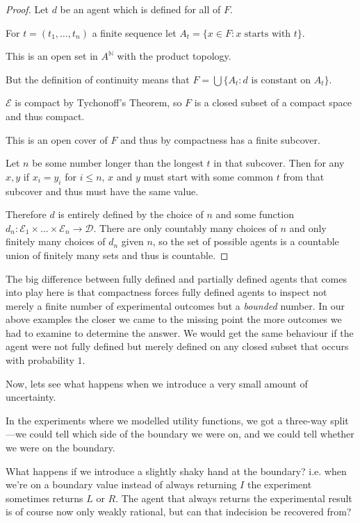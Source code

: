 \begin{proof}
Let $d$ be an agent which is defined for all of $F$.

For $t = (t_1, \ldots, t_n)$
a finite sequence let $A_t = \{ x \in F : x \text{ starts with } t\}$.

This is an open set in $A^{\mathbb{N}}$ with the product topology.

But the definition of continuity means that
$F = \bigcup \{A_t: d \text { is constant on } A_t \}$.

$\mathcal{E}$
is compact by Tychonoff's Theorem, so $F$
is a closed subset of a compact space and thus compact. 

This is an open cover of $F$
and thus by compactness has a finite subcover.

Let $n$ be some number longer than the longest $t$ in that subcover. Then for
any $x, y$ if $x_i = y_i$ for $i \leq n$, $x$ and $y$ must start with some
common $t$ from that subcover and thus must have the same value.

Therefore $d$ is entirely defined by the choice of $n$ and some function
$d_n: \mathcal{E}_1 \times \ldots \times \mathcal{E}_n \to \mathcal{D}$.
There are only countably many choices
of $n$ and only finitely many choices of $d_n$ given $n$, so the set of
possible agents is a countable union of finitely many sets and thus is
countable.
\end{proof}

The big difference between fully defined and partially defined agents that
comes into play here is that compactness forces fully defined agents to
inspect not merely a finite number of experimental outcomes but a \textit{bounded}
number. In our above examples the closer we came to the missing point the
more outcomes we had to examine to determine the answer. We would get
the same behaviour if the agent were not fully defined but merely
defined on any closed subset that occurs with probability $1$.

Now, lets see what happens when we introduce a very small amount of uncertainty.

In the experiments where we modelled utility functions, we got a three-way
split---we could tell which side of the boundary we were on, and we could
tell whether we were on the boundary.

What happens if we introduce a slightly shaky hand at the boundary? i.e.
when we're on a boundary value instead of always returning $I$ the experiment
sometimes returns $L$ or $R$. The agent that always returns the experimental
result is of course now only weakly rational, but can that indecision be
recovered from?

